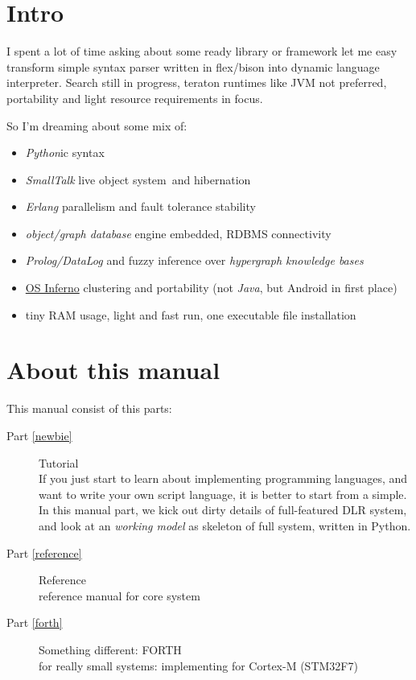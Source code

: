 \clearpage
\section{Intro}%

I spent a lot of time asking about some ready library or framework let me easy
transform simple syntax parser written in flex/bison into dynamic language
interpreter. Search still in progress, teraton runtimes like JVM not preferred,
portability and light resource requirements in focus.

So I'm dreaming about some mix of:
\begin{itemize}[nosep]
  \item \emph{Python}ic syntax 
  \item \emph{SmallTalk} live object system\ and
  hibernation
  \item \emph{Erlang} parallelism and fault tolerance stability
  \item \emph{object/graph database} engine embedded, RDBMS connectivity
  \item \emph{Prolog/DataLog} and fuzzy inference over \emph{hypergraph
  knowledge bases}
  \item \href{http://www.vitanuova.com/inferno/}{OS Inferno} clustering and
  portability (not \emph{Java}, but Android in first place)
  \item tiny RAM usage, light and fast run, one executable file installation
\end{itemize} 

\section{About this manual}%

This manual consist of this parts:
\begin{description}
\item[Part \ref{newbie}] Tutorial\\
If you just start to learn about implementing programming languages, and want to
write your own script language, it is better to start from a simple. In this
manual part, we kick out dirty details of full-featured DLR system, and look at
an \emph{working model} as skeleton of full system, written in Python.
\item[Part \ref{reference}] Reference\\reference manual for core system
\item[Part \ref{forth}] Something different: FORTH\\
for really small systems: implementing for Cortex-M (STM32F7) 
\end{description}
